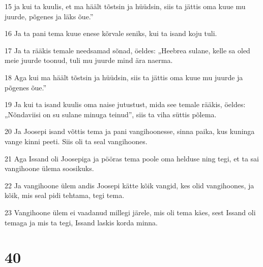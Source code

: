 \par 15 ja kui ta kuulis, et ma häält tõstsin ja hüüdsin, siis ta jättis oma kuue mu juurde, põgenes ja läks õue.”
\par 16 Ja ta pani tema kuue enese kõrvale seniks, kui ta isand koju tuli.
\par 17 Ja ta rääkis temale needsamad sõnad, öeldes: „Heebrea sulane, kelle sa oled meie juurde toonud, tuli mu juurde mind ära naerma.
\par 18 Aga kui ma häält tõstsin ja hüüdsin, siis ta jättis oma kuue mu juurde ja põgenes õue.”
\par 19 Ja kui ta isand kuulis oma naise jutustust, mida see temale rääkis, öeldes: „Nõndaviisi on su sulane minuga teinud”, siis ta viha süttis põlema.
\par 20 Ja Joosepi isand võttis tema ja pani vangihoonesse, sinna paika, kus kuninga vange kinni peeti. Siis oli ta seal vangihoones.
\par 21 Aga Issand oli Joosepiga ja pööras tema poole oma helduse ning tegi, et ta sai vangihoone ülema soosikuks.
\par 22 Ja vangihoone ülem andis Joosepi kätte kõik vangid, kes olid vangihoones, ja kõik, mis seal pidi tehtama, tegi tema.
\par 23 Vangihoone ülem ei vaadanud millegi järele, mis oli tema käes, sest Issand oli temaga ja mis ta tegi, Issand laskis korda minna.

\chapter{40}

